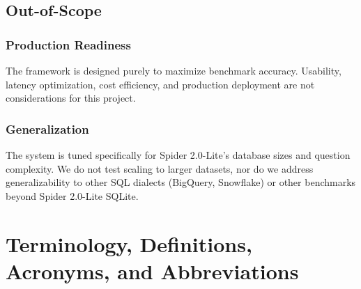 \subsection{Out-of-Scope}

\subsubsection{Production Readiness}
The framework is designed purely to maximize benchmark accuracy. Usability, latency optimization, cost efficiency, and production deployment are not considerations for this project.

\subsubsection{Generalization}
The system is tuned specifically for Spider 2.0-Lite's database sizes and question complexity. We do not test scaling to larger datasets, nor do we address generalizability to other SQL dialects (BigQuery, Snowflake) or other benchmarks beyond Spider 2.0-Lite SQLite.

\section{Terminology, Definitions, Acronyms, and Abbreviations}

